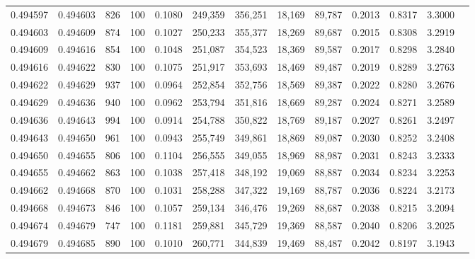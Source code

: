 \begin{tabular}{rrrrrrrrrrrrr}
0.494597 & 0.494603 &   826 & 100 &                                     0.1080 & 249,359 & 356,251 &  18,169 &  89,787 & 0.2013 & 0.8317 & 3.3000 \\
0.494603 & 0.494609 &   874 & 100 &                                     0.1027 & 250,233 & 355,377 &  18,269 &  89,687 & 0.2015 & 0.8308 & 3.2919 \\
0.494609 & 0.494616 &   854 & 100 &                                     0.1048 & 251,087 & 354,523 &  18,369 &  89,587 & 0.2017 & 0.8298 & 3.2840 \\
0.494616 & 0.494622 &   830 & 100 &                                     0.1075 & 251,917 & 353,693 &  18,469 &  89,487 & 0.2019 & 0.8289 & 3.2763 \\
0.494622 & 0.494629 &   937 & 100 &                                     0.0964 & 252,854 & 352,756 &  18,569 &  89,387 & 0.2022 & 0.8280 & 3.2676 \\
0.494629 & 0.494636 &   940 & 100 &                                     0.0962 & 253,794 & 351,816 &  18,669 &  89,287 & 0.2024 & 0.8271 & 3.2589 \\
0.494636 & 0.494643 &   994 & 100 &                                     0.0914 & 254,788 & 350,822 &  18,769 &  89,187 & 0.2027 & 0.8261 & 3.2497 \\
0.494643 & 0.494650 &   961 & 100 &                                     0.0943 & 255,749 & 349,861 &  18,869 &  89,087 & 0.2030 & 0.8252 & 3.2408 \\
0.494650 & 0.494655 &   806 & 100 &                                     0.1104 & 256,555 & 349,055 &  18,969 &  88,987 & 0.2031 & 0.8243 & 3.2333 \\
0.494655 & 0.494662 &   863 & 100 &                                     0.1038 & 257,418 & 348,192 &  19,069 &  88,887 & 0.2034 & 0.8234 & 3.2253 \\
0.494662 & 0.494668 &   870 & 100 &                                     0.1031 & 258,288 & 347,322 &  19,169 &  88,787 & 0.2036 & 0.8224 & 3.2173 \\
0.494668 & 0.494673 &   846 & 100 &                                     0.1057 & 259,134 & 346,476 &  19,269 &  88,687 & 0.2038 & 0.8215 & 3.2094 \\
0.494674 & 0.494679 &   747 & 100 &                                     0.1181 & 259,881 & 345,729 &  19,369 &  88,587 & 0.2040 & 0.8206 & 3.2025 \\
0.494679 & 0.494685 &   890 & 100 &                                     0.1010 & 260,771 & 344,839 &  19,469 &  88,487 & 0.2042 & 0.8197 & 3.1943 \\

\end{tabular}
